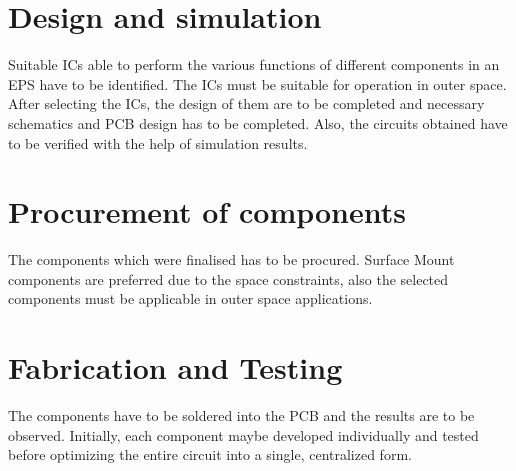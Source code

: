 \section{Design and simulation}
Suitable ICs able to perform the various functions of different components in an EPS have to be identified. The ICs must be suitable for operation in outer space. After selecting the ICs, the design of them are to be completed and necessary schematics and PCB design has to be completed. Also, the circuits obtained have to be verified with the help of simulation results.
\section{Procurement of components}
The components which were finalised has to be procured. Surface Mount components are preferred due to the space constraints, also the selected components must be applicable in outer space applications.
\section{Fabrication and Testing}
The components have to be soldered into the PCB and the results are to be observed. Initially, each component maybe developed individually and tested before optimizing the entire circuit into a single, centralized form. 